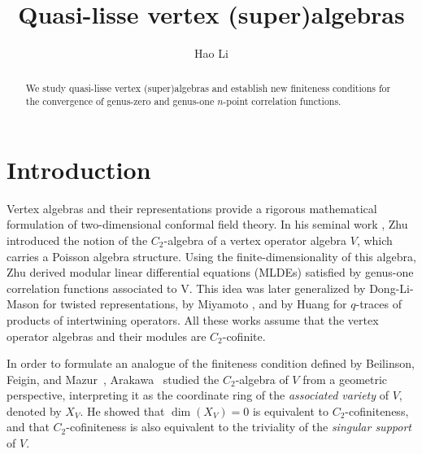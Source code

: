 \documentclass[9pt]{amsart}
\begin{document}
\title[]
{Quasi-lisse vertex (super)algebras}
\author{Hao Li}
\address{Research Institute for Mathematical Sciences, Kyoto University}
\begin{abstract}
 We study quasi-lisse vertex (super)algebras and establish new finiteness conditions for the convergence of genus-zero and genus-one $n$-point correlation functions.

\end{abstract}

\maketitle


\section{Introduction}

Vertex algebras and their representations provide a rigorous mathematical formulation of two-dimensional conformal field theory. In his seminal work \cite{zhu1996modular}, Zhu introduced the notion of the $C_2$-algebra of a vertex operator algebra $V$, which carries a Poisson algebra structure. Using the finite-dimensionality of this algebra, Zhu derived modular linear differential equations (MLDEs) satisfied by genus-one correlation functions associated to V. This idea was later generalized by Dong-Li-Mason \cite{dong2000modular} for twisted representations, by Miyamoto \cite{miyamoto2000intertwining}, and by Huang \cite{huang2005differential} for $q$-traces of products of intertwining operators. All these works assume that the vertex operator algebras and their modules are $C_2$-cofinite.


In order to formulate an analogue of the finiteness condition defined by Beilinson, Feigin, and Mazur~\cite{beilinson1991introduction}, Arakawa~\cite{arakawa2012remark} studied the $C_2$-algebra of $V$ from a geometric perspective, interpreting it as the coordinate ring of the \emph{associated variety} of $V$, denoted by $X_V$. He showed that $\dim(X_V) = 0$ is equivalent to $C_2$-cofiniteness, and that $C_2$-cofiniteness is also equivalent to the triviality of the \emph{singular support} of $V$. 
\end{document}

